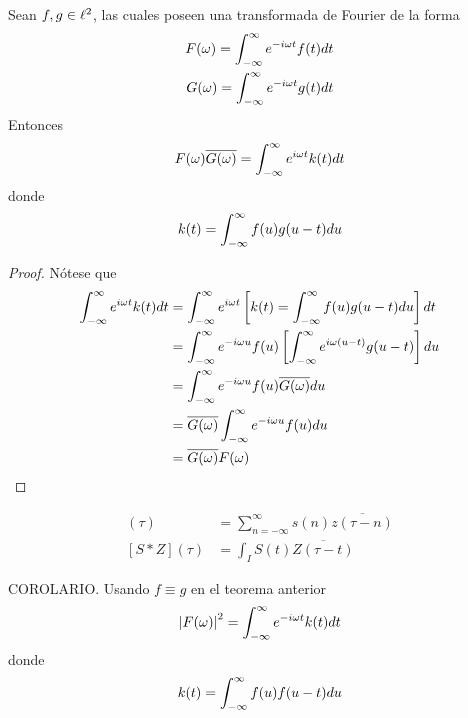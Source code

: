 \begin{teorema}
Sean $f, g \in \ell^{2}$, las cuales poseen una transformada de Fourier de la forma
\begin{align*}
F(\omega) = \int_{-\infty}^{\infty} e^{-i \omega t} f(t) dt \\
G(\omega) = \int_{-\infty}^{\infty} e^{-i \omega t} g(t) dt 
\end{align*}
Entonces
\begin{equation}
F(\omega) \overline{G(\omega)} = \int_{-\infty}^{\infty} e^{i \omega t} k(t) dt
\end{equation}
donde
\begin{equation}
k(t) = \int_{-\infty}^{\infty} f(u) g(u-t) du
\end{equation}
\end{teorema}

\begin{proof}
Nótese que
\begin{align*}
\int_{-\infty}^{\infty} e^{i \omega t} k(t) dt &= \int_{-\infty}^{\infty} e^{i \omega t} \left[ k(t) = \int_{-\infty}^{\infty} f(u) g(u-t) du \right] dt \\
&= \int_{-\infty}^{\infty} e^{-i \omega u} f(u) \left[ \int_{-\infty}^{\infty} e^{i \omega (u-t)} g(u-t) \right] du \\
&= \int_{-\infty}^{\infty} e^{-i \omega u} f(u) \overline{G(\omega)} du \\
&= \overline{G(\omega)} \int_{-\infty}^{\infty} e^{-i \omega u} f(u)  du \\
&= \overline{G(\omega)} F(\omega) \\
\end{align*}
\end{proof}

\begin{align*}
[s \ast z] (\tau) &= \sum_{n=-\infty}^{\infty} s(n) \overline{z(\tau-n)} \\
[S \ast Z] (\tau) &= \int_I S(t) \overline{Z(\tau-t)}
\end{align*}

\begin{teorema}
COROLARIO. Usando $f \equiv g$ en el teorema anterior
\begin{equation}
\left| F(\omega) \right|^{2} = \int_{-\infty}^{\infty} e^{- i \omega t} k(t) dt 
\end{equation}
donde 
\begin{equation}
k(t) = \int_{-\infty}^{\infty} f(u) f(u-t) du
\end{equation}
\end{teorema}


